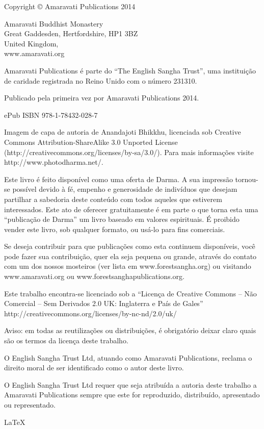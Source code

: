 
\cleartorecto

Copyright © Amaravati Publications 2014

Amaravati Buddhist Monastery\\
Great Gaddesden, Hertfordshire, HP1 3BZ\\
United Kingdom,\\
www.amaravati.org

Amaravati Publications é parte do “The English Sangha Trust”, uma
instituição de caridade registrada no Reino Unido com o número 231310.

Publicado pela primeira vez por Amaravati Publications 2014.

ePub ISBN 978-1-78432-028-7

Imagem de capa de autoria de Anandajoti Bhikkhu, licenciada sob Creative
Commons Attribution-ShareAlike 3.0 Unported License
(http://creativecommons.org/licenses/by-sa/3.0/). Para mais informações
visite http://www.photodharma.net/. 

Este livro é feito disponível como uma oferta de Darma. A sua impressão
tornou-se possível devido à fé, empenho e generosidade de indivíduos
que desejam partilhar a sabedoria deste conteúdo com todos aqueles que
estiverem interessados. Este ato de oferecer gratuitamente é em parte o
que torna esta uma “publicação de Darma” um livro baseado em valores
espirituais. É proibido vender este livro, sob qualquer formato, ou
usá-lo para fins comerciais.

Se deseja contribuir para que publicações como esta continuem
disponíveis, você pode fazer sua contribuição, quer ela seja pequena ou
grande, através do contato com um dos nossos mosteiros (ver lista em
www.forestsangha.org) ou visitando www.amaravati.org ou
www.forestsanghapublications.org.

Este trabalho encontra-se licenciado sob a “Licença de Creative Commons
-- Não Comercial -- Sem Derivados 2.0 UK: Inglaterra e País de Gales”
http://creativecommons.org/licenses/by-nc-nd/2.0/uk/

Aviso: em todas as reutilizações ou distribuições, é obrigatório deixar
claro quais são os termos da licença deste trabalho.

O English Sangha Trust Ltd, atuando como Amaravati Publications, reclama
o direito moral de ser identificado como o autor deste livro.

O English Sangha Trust Ltd requer que seja atribuída a autoria deste
trabalho a Amaravati Publications sempre que este for reproduzido,
distribuído, apresentado ou representado.

\LaTeX

